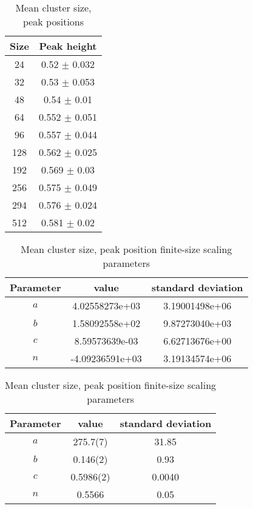 \begin{table}[H]
\begin{center}
    \begin{tabular}{||c | c|| }
    \hline
       Size & Peak height     \\
    \hline
         24 & 0.52 $\pm$ 0.032  \\
         32 & 0.53 $\pm$ 0.053  \\
         48 & 0.54 $\pm$ 0.01   \\
         64 & 0.552 $\pm$ 0.051 \\
         96 & 0.557 $\pm$ 0.044 \\
        128 & 0.562 $\pm$ 0.025 \\
        192 & 0.569 $\pm$ 0.03  \\
        256 & 0.575 $\pm$ 0.049 \\
        294 & 0.576 $\pm$ 0.024 \\
        512 & 0.581 $\pm$ 0.02  \\
    \hline
    \end{tabular}
\end{center}
\caption{Mean cluster size, peak positions}
\label{table:pp_mean_cluster_size_peak_positions}
\end{table}


\begin{table}[H]
\begin{center}
    \begin{tabular}{||c | c c|| }
    \hline
      Parameter &  value & standard deviation \\
    \hline
      $a$ &    4.02558273e+03  &  3.19001498e+06 \\
      $b$ &    1.58092558e+02 &  9.87273040e+03 \\
      $c$ & 8.59573639e-03 & 6.62713676e+00  \\
      $n$ & -4.09236591e+03 & 3.19134574e+06 \\
    \hline
    \end{tabular}
\end{center}
\caption{Mean cluster size, peak position finite-size scaling parameters}
\label{table:pp_mean_cluster_size_peak_height_finite_size_scaling_params}
\end{table}


\begin{table}[H]
\begin{center}
    \begin{tabular}{||c | c c|| }
    \hline
      Parameter &  value & standard deviation \\
    \hline
      $a$ &    275.7(7)  &  31.85 \\
      $b$ &    0.146(2) &  0.93 \\
      $c$ & 0.5986(2) & 0.0040 \\
      $n$ & 0.5566 & 0.05 \\
    \hline
    \end{tabular}
\end{center}
\caption{Mean cluster size, peak position finite-size scaling parameters}
\label{table:pp_mean_cluster_size_peak_position_finite_size_scaling_params}
\end{table}


